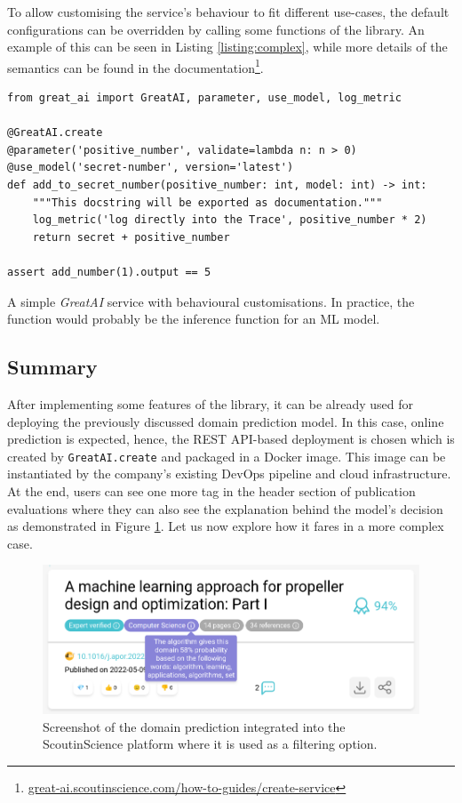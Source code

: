 To allow customising the service's behaviour to fit different use-cases, the default configurations can be overridden by calling some functions of the library. An example of this can be seen in Listing \ref{listing:complex}, while more details of the semantics can be found in the documentation\footnote{\href{https://great-ai.scoutinscience.com/how-to-guides/create-service/}{great-ai.scoutinscience.com/how-to-guides/create-service}}.

\begin{listing}[!ht]
\begin{verbatim}
from great_ai import GreatAI, parameter, use_model, log_metric

@GreatAI.create
@parameter('positive_number', validate=lambda n: n > 0)
@use_model('secret-number', version='latest')
def add_to_secret_number(positive_number: int, model: int) -> int:
    """This docstring will be exported as documentation."""
    log_metric('log directly into the Trace', positive_number * 2)
    return secret + positive_number

assert add_number(1).output == 5
\end{verbatim}
\captionsetup{width=.9\linewidth}
\caption{A simple \textit{GreatAI} service with behavioural customisations. In practice, the function would probably be the inference function for an ML model.}
\label{listing:complex}
\end{listing}

\subsection{Summary}

After implementing some features of the library, it can be already used for deploying the previously discussed domain prediction model. In this case, online prediction is expected, hence, the REST API-based deployment is chosen which is created by \texttt{GreatAI.create} and packaged in a Docker image. This image can be instantiated by the company's existing DevOps pipeline and cloud infrastructure. At the end, users can see one more tag in the header section of publication evaluations where they can also see the explanation behind the model's decision as demonstrated in Figure \ref{fig:dashboard-domains}. Let us now explore how it fares in a more complex case.

\begin{figure}
    \centering
    \includegraphics[width=0.7\linewidth]{figures/dashboard-domains.png}
    \captionsetup{width=.9\linewidth}
    \caption{Screenshot of the domain prediction integrated into the ScoutinScience platform where it is used as a filtering option.}
    \label{fig:dashboard-domains}
\end{figure}
